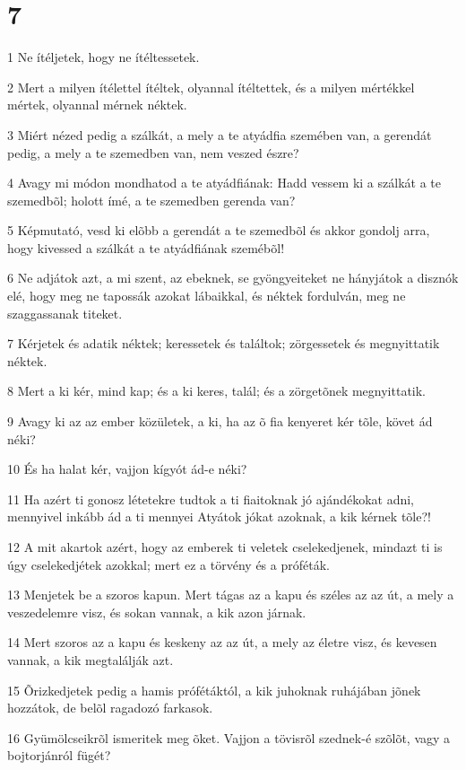 \chapter{7}

\par 1 Ne ítéljetek, hogy ne ítéltessetek.
\par 2 Mert a milyen ítélettel ítéltek, olyannal ítéltettek, és a milyen mértékkel mértek, olyannal mérnek néktek.
\par 3 Miért nézed pedig a szálkát, a mely a te atyádfia szemében van, a gerendát pedig, a mely a te szemedben van, nem veszed észre?
\par 4 Avagy mi módon mondhatod a te atyádfiának: Hadd vessem ki a szálkát a te szemedbõl; holott ímé, a te szemedben gerenda van?
\par 5 Képmutató, vesd ki elõbb a gerendát a te szemedbõl és akkor gondolj arra, hogy kivessed a szálkát a te atyádfiának szemébõl!
\par 6 Ne adjátok azt, a mi szent, az ebeknek, se gyöngyeiteket ne hányjátok a disznók elé, hogy meg ne tapossák azokat lábaikkal, és néktek fordulván, meg ne szaggassanak titeket.
\par 7 Kérjetek és adatik néktek; keressetek és találtok; zörgessetek és megnyittatik néktek.
\par 8 Mert a ki kér, mind kap; és a ki keres, talál; és a zörgetõnek megnyittatik.
\par 9 Avagy ki az az ember közületek, a ki, ha az õ fia kenyeret kér tõle, követ ád néki?
\par 10 És ha halat kér, vajjon kígyót ád-e néki?
\par 11 Ha azért ti gonosz létetekre tudtok a ti fiaitoknak jó ajándékokat adni, mennyivel inkább ád a ti mennyei Atyátok jókat azoknak, a kik kérnek tõle?!
\par 12 A mit akartok azért, hogy az emberek ti veletek cselekedjenek, mindazt ti is úgy cselekedjétek azokkal; mert ez a törvény és a próféták.
\par 13 Menjetek be a szoros kapun. Mert tágas az a kapu és széles az az út, a mely a veszedelemre visz, és sokan vannak, a kik azon járnak.
\par 14 Mert szoros az a kapu és keskeny az az út, a mely az életre visz, és kevesen vannak, a kik megtalálják azt.
\par 15 Õrizkedjetek pedig a hamis prófétáktól, a kik juhoknak ruhájában jõnek hozzátok, de  belõl ragadozó farkasok.
\par 16 Gyümölcseikrõl ismeritek meg õket. Vajjon a tövisrõl szednek-é szõlõt, vagy a bojtorjánról fügét?
